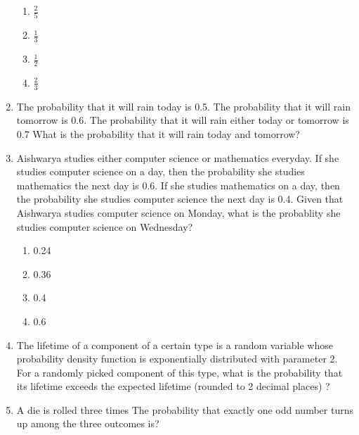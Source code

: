 \documentclass[journal,12pt,twocolumn]{IEEEtran}
\begin{document}
\begin{enumerate}
\begin{enumerate}
\item $ \frac{2}{5}$\\
\item $\frac{1}{3}$\\
\item $ \frac{1}{2}$\\
\item $\frac{2}{3}$

\end{enumerate}  
%
%
%
\item The probability that it will rain today is 0.5. The probability that it will rain tomorrow is 0.6. The probability that it will rain either today or tomorrow is 0.7 What is the probability that it will rain today and tomorrow?
%
\solution

\item Aishwarya studies either computer science or mathematics everyday. If she studies computer science on a day, then the probability she studies mathematics the next day is 0.6. If she studies mathematics on a day, then the probability she studies computer science the next day is 0.4.
Given that Aishwarya studies computer science on Monday, what is the probablity she studies computer science on Wednesday?
\begin{enumerate}[label=(\Alph*)]

\item 0.24
\item 0.36
\item 0.4
\item 0.6

\end{enumerate}
%
\solution

%
\item The lifetime of a component of a certain type is a random variable whose probability density function is exponentially distributed with parameter 2. For a randomly picked component of this type, what is the probability that its lifetime exceeds the expected lifetime (rounded to 2 decimal places) ?
%
\solution

%
\item A die is rolled three times The probability that exactly one odd number turns up among the three outcomes is?
%
\solution

%

\end{enumerate}
\end{document}
